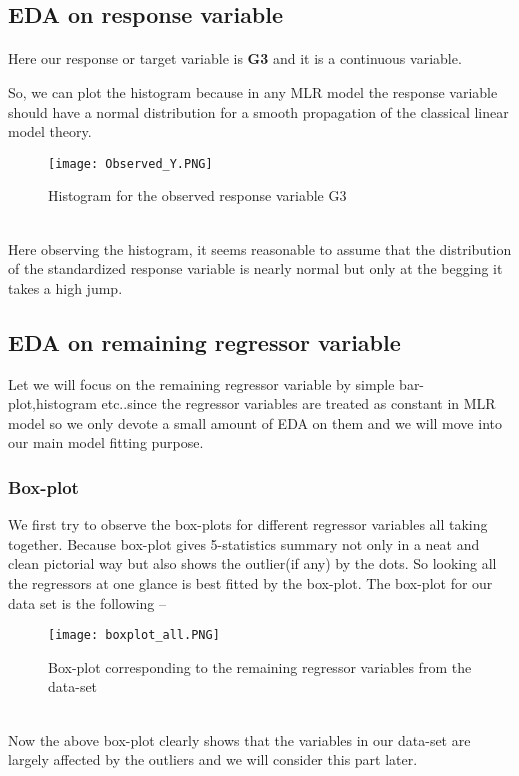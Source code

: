 \documentclass[A4paper,11pt]{report}
\begin{document}
	\subsection{EDA on response variable}
	\paragraph{} Here our response or target variable is \textbf{G3} and it is a continuous variable.
	 
	So, we can plot the histogram because in any MLR model the response variable should have a normal distribution for a smooth propagation of the classical linear model theory. \\
	\begin{figure}[h]
		\texttt{[image: Observed\_Y.PNG]}
		\caption{Histogram for the observed response variable G3}
	\end{figure}\\
	Here observing the histogram, it seems reasonable to assume that the distribution of the standardized response variable is nearly normal but only at the begging it takes a high jump.
	\subsection{EDA on remaining regressor variable}
	\par Let we will focus on the remaining regressor variable by simple bar-plot,histogram etc..since the regressor variables are treated as constant in MLR model so we only devote a small amount of EDA on them and we will move into our main model fitting purpose.\\
	\subsubsection{Box-plot}
	We first try to observe the box-plots for different regressor variables all taking together. Because box-plot gives 5-statistics summary not only in a neat and clean pictorial way but also shows the outlier(if any) by the dots.
	So looking all the regressors at one glance is best fitted by the box-plot. The box-plot for our data set is the following --\\
	\begin{figure}
		\texttt{[image: boxplot\_all.PNG]}
		\caption{Box-plot corresponding to the remaining regressor variables from the data-set}
	\end{figure}\\
	Now the above box-plot clearly shows that the variables in our data-set are largely affected by the outliers and we will consider this part later.\\
\end{document}
